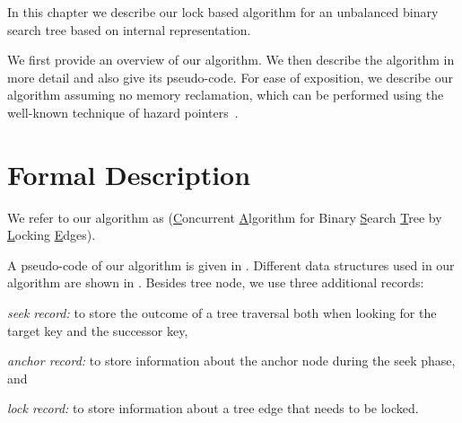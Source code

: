 \begin{limitscope}
\newcommand{\accesspath}{access-path}
\newcommand{\terminalnode}{terminal node}

\newcommand{\sNodeOne}{\mathbb{R}}
\newcommand{\sNodeTwo}{\mathbb{S}}
\newcommand{\sKeyOne}{\infty_1}
\newcommand{\sKeyTwo}{\infty_2}

\newcommand{\targetnode}{target node}
\newcommand{\anchornode}{anchor node}

\newcommand{\myparent}{parent}
\newcommand{\myleft}{le\!f\!t}
\newcommand{\myright}{right}

\newcommand{\RemoveChild}{\textsc{RemoveChild}}
\newcommand{\LockAll}{\textsc{LockAll}}
\newcommand{\UnlockAll}{\textsc{UnlockAll}}
\newcommand{\ClearFlags}{\textsc{ClearFlags}}
\newcommand{\FindSmallest}{\textsc{FindSmallest}}

\newcommand{\lFlag}{lFlag}
\newcommand{\mFlag}{mFlag}
\newcommand{\nFlag}{nFlag}


In this chapter we describe our lock based algorithm for an unbalanced binary search tree based on internal representation.

We first provide an overview of our algorithm. We then describe the algorithm in more detail and also give its pseudo-code. For ease of exposition, we describe our algorithm assuming no memory reclamation, which can be performed using the well-known technique of hazard pointers~\cite{Mic:2004:TPDS}.





\section{Formal Description}

We refer to our algorithm as \CASTLE{} (\underline{C}oncurrent \underline{A}lgorithm for Binary \underline{S}earch \underline{T}ree by \underline{L}ocking \underline{E}dges). 



A pseudo-code of our algorithm is given in .
Different data structures used in our algorithm are shown in . Besides tree node, we use three additional records:
\begin{enumerate*}[label=(\alph*)]
\item  \emph{seek record:} to store the outcome of a tree traversal both when looking for the target key and the successor key, 
\item \emph{anchor record:} to store information about the \anchornode{} during the seek phase, and
\item  \emph{lock record:} to store information about a tree edge that needs to be locked. 
\end{enumerate*}


\end{limitscope}
